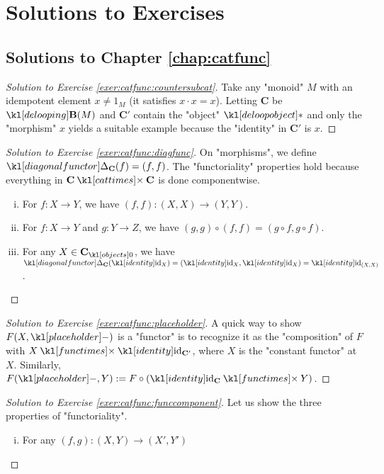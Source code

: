 \documentclass[main.tex]{subfiles}
\begin{document}
\chapter{Solutions to Exercises}\label{chap:solutions}
\section{Solutions to Chapter \ref{chap:catfunc}}
\begin{proof}[Solution to Exercise \ref{exer:catfunc:countersubcat}]\label{soln:catfunc:countersubcat}
    Take any "monoid" $M$ with an idempotent element $x\neq 1_M$ (it satisfies $x\cdot x = x$). Letting $\mathbf{C}$ be $\deloop{M}$ and $\mathbf{C}'$ contain the "object" $\deloopobject$ and only the "morphism" $x$ yields a suitable example because the "identity" in $\mathbf{C}'$ is $x$.
\end{proof}
\begin{proof}[Solution to Exercise \ref{exer:catfunc:diagfunc}]\label{soln:catfunc:diagfunc}
    On "morphisms", we define $\diagFunc_{\mathbf{C}}(f) = (f,f)$. The "functoriality" properties hold because everything in $\mathbf{C}\cattimes \mathbf{C}$ is done componentwise.
    \begin{enumerate}[i.]
        \item For $f: X \rightarrow Y$, we have $(f,f): (X,X) \rightarrow (Y,Y)$.
        \item For $f: X \rightarrow Y$ and $g: Y \rightarrow Z$, we have $(g,g) \circ (f,f) = (g \circ f, g \circ f)$.
        \item For any $X \in \obj{\mathbf{C}}$, we have $\diagFunc_{\mathbf{C}}(\id_X) = (\id_X,\id_X) = \id_{(X,X)}$.
    \end{enumerate}
\end{proof}
\begin{proof}[Solution to Exercise \ref{exer:catfunc:placeholder}]\label{soln:catfunc:placeholder}
    A quick way to show $F(X,\placeholder)$ is a "functor" is to recognize it as the "composition" of $F$ with $X \functimes \id_{\mathbf{C}'}$, where $X$ is the "constant functor" at $X$. Similarly, $F(\placeholder, Y) := F \circ (\id_{\mathbf{C}} \functimes Y)$.
\end{proof}
\begin{proof}[Solution to Exercise \ref{exer:catfunc:funccomponent}]\label{soln:catfunc:funccomponent}
    Let us show the three properties of "functoriality".
    \begin{enumerate}[i.]
        \item For any $(f,g): (X,Y) \rightarrow (X',Y')$%
    \end{enumerate}
\end{proof}
\end{document}
